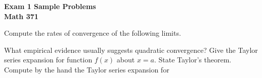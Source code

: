 \documentclass[addpoints, 11pt]{exam}
\newcommand{\ds}{\displaystyle}
\begin{document}
\begin{center}
\Large \bfseries Exam 1 Sample Problems \\
Math 371 \\ \normalsize
\end{center}

\begin{questions}
\question Compute the rates of convergence of the following limits.
\question What empirical evidence usually suggests quadratic convergence?
\question Give the Taylor series expansion for function $f(x)$ about $x=a$.
\question State Taylor's theorem.
\question Compute by the hand the Taylor series expansion for 
\end{questions}
\end{document}
